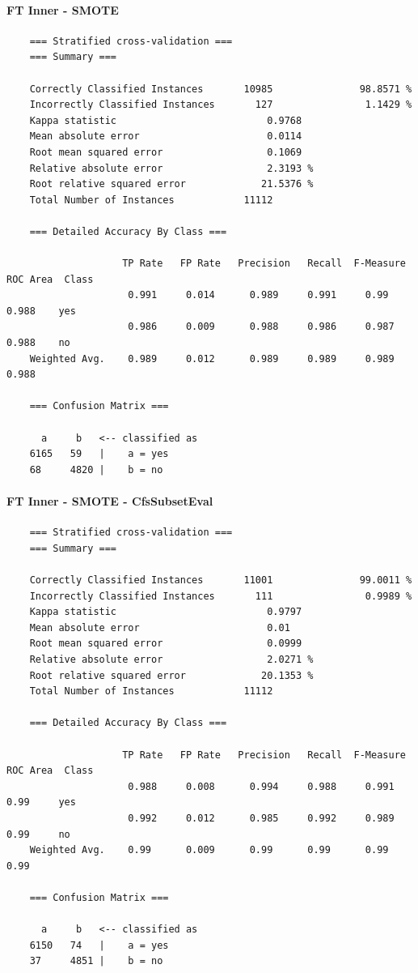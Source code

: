 \paragraph{FT Inner - SMOTE}
{\footnotesize
	\begin{verbatim}
	=== Stratified cross-validation ===
	=== Summary ===
	
	Correctly Classified Instances       10985               98.8571 %
	Incorrectly Classified Instances       127                1.1429 %
	Kappa statistic                          0.9768
	Mean absolute error                      0.0114
	Root mean squared error                  0.1069
	Relative absolute error                  2.3193 %
	Root relative squared error             21.5376 %
	Total Number of Instances            11112     
	
	=== Detailed Accuracy By Class ===
	
	                TP Rate   FP Rate   Precision   Recall  F-Measure   ROC Area  Class
	                 0.991     0.014      0.989     0.991     0.99       0.988    yes
	                 0.986     0.009      0.988     0.986     0.987      0.988    no
	Weighted Avg.    0.989     0.012      0.989     0.989     0.989      0.988
	
	=== Confusion Matrix ===
	
	  a     b   <-- classified as
	6165   59   |    a = yes
	68     4820 |    b = no	
	\end{verbatim}
}
\paragraph{FT Inner - SMOTE - CfsSubsetEval}
{\footnotesize
	\begin{verbatim}
	=== Stratified cross-validation ===
	=== Summary ===
	
	Correctly Classified Instances       11001               99.0011 %
	Incorrectly Classified Instances       111                0.9989 %
	Kappa statistic                          0.9797
	Mean absolute error                      0.01  
	Root mean squared error                  0.0999
	Relative absolute error                  2.0271 %
	Root relative squared error             20.1353 %
	Total Number of Instances            11112     
	
	=== Detailed Accuracy By Class ===
	
	                TP Rate   FP Rate   Precision   Recall  F-Measure   ROC Area  Class
	                 0.988     0.008      0.994     0.988     0.991      0.99     yes
	                 0.992     0.012      0.985     0.992     0.989      0.99     no
	Weighted Avg.    0.99      0.009      0.99      0.99      0.99       0.99 
	
	=== Confusion Matrix ===
	
	  a     b   <-- classified as
	6150   74   |    a = yes
	37     4851 |    b = no
	\end{verbatim}
}
